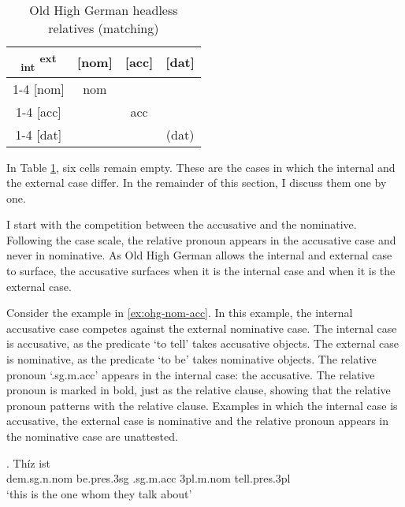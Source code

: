 \begin{table}[ht]
  \center
  \caption{Old High German headless relatives (matching)}
  \begin{tabular}{c|c|c|c}
    \toprule
     \textsubscript{\ac{int}} \textsuperscript{\ac{ext}}
          & [\ac{nom}]
          & [\ac{acc}]
          & [\ac{dat}]
          \\ \cmidrule{1-4}
      [\ac{nom}]
          & \colorbox{LG}{\ac{nom}}
          &
          &
          \\ \cmidrule{1-4}
      [\ac{acc}]
          &
          & \colorbox{DG}{\ac{acc}}
          &
          \\ \cmidrule{1-4}
      [\ac{dat}]
          &
          &
          & (\ac{dat})
          \\
    \bottomrule
  \end{tabular}
    \label{tbl:summary-ohg-matching}
\end{table}

In Table \ref{tbl:summary-ohg-matching}, six cells remain empty. These are the cases in which the internal and the external case differ. In the remainder of this section, I discuss them one by one.

I start with the competition between the accusative and the nominative. Following the case scale, the relative pronoun appears in the accusative case and never in nominative. As Old High German allows the internal and external case to surface, the accusative surfaces when it is the internal case and when it is the external case.

Consider the example in \ref{ex:ohg-nom-acc}. In this example, the internal accusative case competes against the external nominative case.
The internal case is accusative, as the predicate  `to tell' takes accusative objects.
The external case is nominative, as the predicate  `to be' takes nominative objects.
The relative pronoun  `.\ac{sg}.\ac{m}.\ac{acc}' appears in the internal case: the accusative. The relative pronoun is marked in bold, just as the relative clause, showing that the relative pronoun patterns with the relative clause.
Examples in which the internal case is accusative, the external case is nominative and the relative pronoun appears in the nominative case are unattested.

\exg. Thíz ist   \\
\ac{dem}.\ac{sg}.\ac{n}.\ac{nom} be.\ac{pres}.3\ac{sg}\scsub{[nom]} .\ac{sg}.\ac{m}.\ac{acc} 3\ac{pl}.\ac{m}.\ac{nom} tell.\ac{pres}.3\ac{pl}\scsub{[acc]}\\
`this is the one whom they talk about' \label{ex:ohg-nom-acc}

